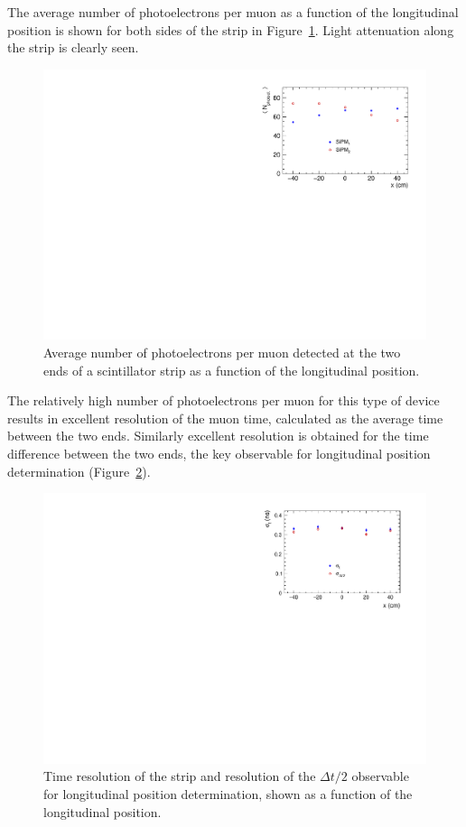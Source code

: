 The average number of photoelectrons per muon as a function of the longitudinal position is shown for both sides of the strip in Figure~\ref{fig:nphot}. Light attenuation along the strip is clearly seen.

\begin{figure}[h!]
\centering
   \includegraphics[width=.6\textwidth]{MuonDetector/Scintillator/nphot}
   \caption{\label{fig:nphot} Average number of photoelectrons per muon detected at the two ends of a scintillator strip as a function of the longitudinal position.}
\end{figure}

The relatively high number of photoelectrons per muon for this type of device results in excellent resolution of the muon time, calculated as the average time between the two ends. Similarly excellent resolution is obtained for the time difference between the two ends, the key observable for longitudinal position determination (Figure~\ref{fig:sigma-tdt}).

\begin{figure}[h!]
\centering
   \includegraphics[width=.6\textwidth]{MuonDetector/Scintillator/sigma-tdt}
   \caption{\label{fig:sigma-tdt} Time resolution of the strip and resolution of the $\Delta t/2$ observable for longitudinal position determination, shown as a function of the longitudinal position.}
\end{figure}


